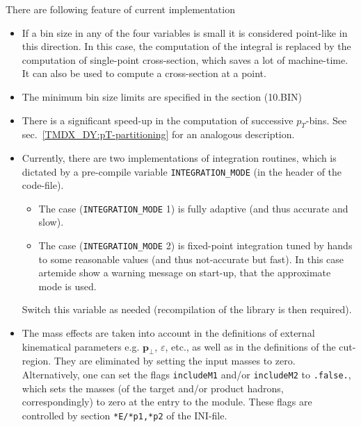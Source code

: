 \documentclass[prd,nofootinbib,eqsecnum,final]{revtex4}
\renewcommand{\(}{\left(}
\renewcommand{\)}{\right)}
\renewcommand{\[}{\left[}
\renewcommand{\]}{\right]}
\renewcommand{\vec}[1]{\bm{#1}}
\begin{document}
There are following feature of current implementation
\begin{itemize}
\item If a bin size in any of the four variables is small it is considered point-like in this direction. In this case, the computation of the integral is replaced by the computation of single-point cross-section, which saves a lot of machine-time. It can also be used to compute a cross-section at a point.
\item The minimum bin size limits are specified in the section (10.BIN)
\item There is a significant speed-up in the computation of successive $p_T$-bins. See sec.~\ref{TMDX_DY:pT-partitioning} for an analogous description.
\item Currently, there are two implementations of integration routines, which is dictated by a pre-compile variable \texttt{INTEGRATION\_MODE} (in the header of the code-file). 
\begin{itemize}
\item The case (\texttt{INTEGRATION\_MODE} 1) is fully adaptive (and thus accurate and slow).
\item The case (\texttt{INTEGRATION\_MODE} 2) is fixed-point integration tuned by hands to some reasonable values (and thus not-accurate but fast). In this case artemide show a warning message on start-up, that the approximate mode is used.
\end{itemize}
Switch this variable as needed (recompilation of the library is then required).
\item The mass effects are taken into account in the definitions of external kinematical parameters e.g. $\vec p_\perp$, $\varepsilon$, etc., as well as in the definitions of the cut-region. They are eliminated by setting the input masses to zero. Alternatively, one can set the flags \texttt{includeM1} and/or \texttt{includeM2} to \texttt{.false.}, which sets the masses (of the target and/or product hadrons, correspondingly) to zero at the entry to the module. These flags are controlled by section \texttt{*E/*p1,*p2} of the INI-file.
\end{itemize}
\end{document}
